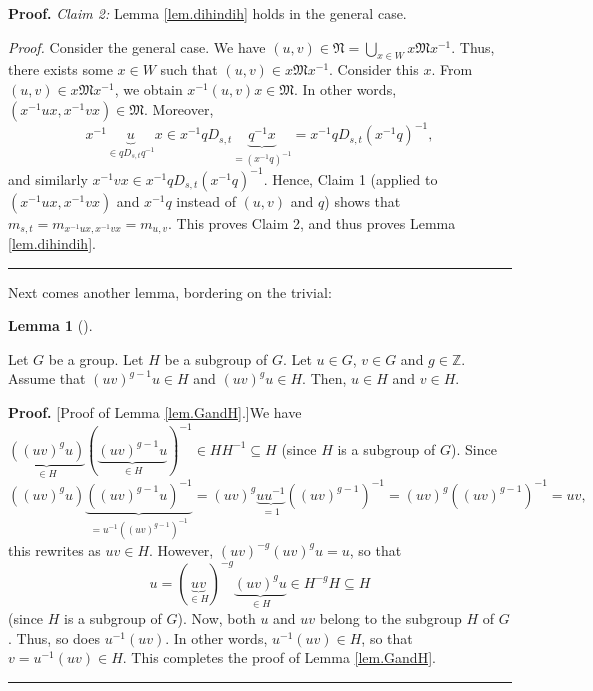 \documentclass
[numbers=enddot,12pt,final,onecolumn,notitlepage,abstracton]{scrartcl}%
\theoremstyle{definition}
\newtheorem{lem}[theo]{Lemma}
\newenvironment{lemma}[1][]
{\begin{lem}[#1]\begin{leftbar}}
{\end{leftbar}\end{lem}}
\newenvironment{proof}[1][Proof]{\noindent\textbf{#1.} }{\ \rule{0.5em}{0.5em}}
\begin{document}
\begin{proof}
\textit{Claim 2:} Lemma \ref{lem.dihindih} holds in the general case.

\textit{Proof.} Consider the general case. We have $\left(  u,v\right)
\in\mathfrak{N}=\bigcup_{x\in W}x\mathfrak{M}x^{-1}$. Thus, there exists some
$x\in W$ such that $\left(  u,v\right)  \in x\mathfrak{M}x^{-1}$. Consider
this $x$. From $\left(  u,v\right)  \in x\mathfrak{M}x^{-1}$, we obtain
$x^{-1}\left(  u,v\right)  x\in\mathfrak{M}$. In other words, $\left(
x^{-1}ux,x^{-1}vx\right)  \in\mathfrak{M}$. Moreover,
\[
x^{-1}\underbrace{u}_{\in qD_{s,t}q^{-1}}x\in x^{-1}qD_{s,t}\underbrace{q^{-1}%
x}_{=\left(  x^{-1}q\right)  ^{-1}}=x^{-1}qD_{s,t}\left(  x^{-1}q\right)
^{-1},
\]
and similarly $x^{-1}vx\in x^{-1}qD_{s,t}\left(  x^{-1}q\right)  ^{-1}$.
Hence, Claim 1 (applied to $\left(  x^{-1}ux,x^{-1}vx\right)  $ and $x^{-1}q$
instead of $\left(  u,v\right)  $ and $q$) shows that $m_{s,t}=m_{x^{-1}%
ux,x^{-1}vx}=m_{u,v}$. This proves Claim 2, and thus proves Lemma
\ref{lem.dihindih}.
\end{proof}

Next comes another lemma, bordering on the trivial:

\begin{lemma}
\label{lem.GandH}Let $G$ be a group. Let $H$ be a subgroup of $G$. Let $u\in
G$, $v\in G$ and $g\in\mathbb{Z}$. Assume that $\left(  uv\right)  ^{g-1}u\in
H$ and $\left(  uv\right)  ^{g}u\in H$. Then, $u\in H$ and $v\in H$.
\end{lemma}

\begin{proof}
[Proof of Lemma \ref{lem.GandH}.]We have $\underbrace{\left(  \left(
uv\right)  ^{g}u\right)  }_{\in H}\left(  \underbrace{\left(  uv\right)
^{g-1}u}_{\in H}\right)  ^{-1}\in HH^{-1}\subseteq H$ (since $H$ is a subgroup
of $G$). Since
\[
\left(  \left(  uv\right)  ^{g}u\right)  \underbrace{\left(  \left(
uv\right)  ^{g-1}u\right)  ^{-1}}_{=u^{-1}\left(  \left(  uv\right)
^{g-1}\right)  ^{-1}}=\left(  uv\right)  ^{g}\underbrace{uu^{-1}}_{=1}\left(
\left(  uv\right)  ^{g-1}\right)  ^{-1}=\left(  uv\right)  ^{g}\left(  \left(
uv\right)  ^{g-1}\right)  ^{-1}=uv,
\]
this rewrites as $uv\in H$. However, $\left(  uv\right)  ^{-g}\left(
uv\right)  ^{g}u=u$, so that
\[
u=\left(  \underbrace{uv}_{\in H}\right)  ^{-g}\underbrace{\left(  uv\right)
^{g}u}_{\in H}\in H^{-g}H\subseteq H
\]
(since $H$ is a subgroup of $G$). Now, both $u$ and $uv$ belong to the
subgroup $H$ of $G$. Thus, so does $u^{-1}\left(  uv\right)  $. In other
words, $u^{-1}\left(  uv\right)  \in H$, so that $v=u^{-1}\left(  uv\right)
\in H$. This completes the proof of Lemma \ref{lem.GandH}.
\end{proof}
\end{document}
